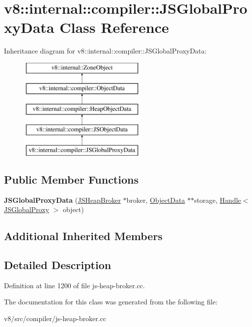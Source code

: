 \hypertarget{classv8_1_1internal_1_1compiler_1_1JSGlobalProxyData}{}\section{v8\+:\+:internal\+:\+:compiler\+:\+:J\+S\+Global\+Proxy\+Data Class Reference}
\label{classv8_1_1internal_1_1compiler_1_1JSGlobalProxyData}
Inheritance diagram for v8\+:\+:internal\+:\+:compiler\+:\+:J\+S\+Global\+Proxy\+Data\+:\begin{figure}[H]
\begin{center}
\leavevmode
\includegraphics[height=5.000000cm]{classv8_1_1internal_1_1compiler_1_1JSGlobalProxyData}
\end{center}
\end{figure}
\subsection*{Public Member Functions}
\begin{DoxyCompactItemize}
\item 
\mbox{\label{classv8_1_1internal_1_1compiler_1_1JSGlobalProxyData_a6c3ca9b220fcb7ec7cab7885118bd6d8}} 
{\bfseries J\+S\+Global\+Proxy\+Data} (\mbox{\hyperlink{classv8_1_1internal_1_1compiler_1_1JSHeapBroker}{J\+S\+Heap\+Broker}} $\ast$broker, \mbox{\hyperlink{classv8_1_1internal_1_1compiler_1_1ObjectData}{Object\+Data}} $\ast$$\ast$storage, \mbox{\hyperlink{classv8_1_1internal_1_1Handle}{Handle}}$<$ \mbox{\hyperlink{classv8_1_1internal_1_1JSGlobalProxy}{J\+S\+Global\+Proxy}} $>$ object)
\end{DoxyCompactItemize}
\subsection*{Additional Inherited Members}


\subsection{Detailed Description}


Definition at line 1200 of file js-\/heap-\/broker.\+cc.



The documentation for this class was generated from the following file\+:\begin{DoxyCompactItemize}
\item 
v8/src/compiler/js-\/heap-\/broker.\+cc\end{DoxyCompactItemize}
